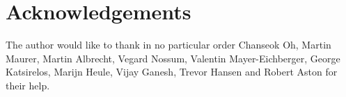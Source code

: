 \documentclass[final]{ieee}
\begin{document}
\section*{Acknowledgements}
The author would like to thank in no particular order Chanseok Oh, Martin Maurer, Martin Albrecht, Vegard Nossum, Valentin Mayer-Eichberger, George Katsirelos, Marijn Heule, Vijay Ganesh, Trevor Hansen and Robert Aston for their help.




\vfill
\pagebreak
\end{document}
